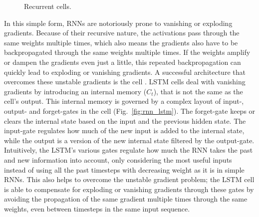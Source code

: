 			\begin{figure}[ht]
				\centering
				\caption[Recurrent cells]{Recurrent cells.}
				\label{fig:rnn}
			\end{figure}
			
			In this simple form, \acp{RNN} are notoriously prone to vanishing or exploding gradients.
			Because of their recursive nature, the activations pass through the same weights multiple times, which also means the gradients also have to be backpropagated through the same weights multiple times.
			If the weights amplify or dampen the gradients even just a little, this repeated backpropagation can quickly lead to exploding or vanishing gradients.		
			A successful architecture that overcomes these unstable gradients is the  cell \cite{lstm}.
			\ac{LSTM} cells deal with vanishing gradients by introducing an internal memory ($C_t$), that is not the same as the cell’s output.
			This internal memory is governed by a complex layout of input-, output- and forget-gates in the cell (Fig.~\ref{fig:rnn_lstm}).
			The forget-gate keeps or clears the internal state based on the input and the previous hidden state. 
			The input-gate regulates how much of the new input is added to the internal state, while the output is a version of the new internal state filtered by the output-gate.
			Intuitively, the \ac{LSTM}’s various gates regulate how much the \ac{RNN} takes the past and new information into account, only considering the most useful inputs instead of using all the past timesteps with decreasing weight as it is in simple \acp{RNN}.
			This also helps to overcome the unstable gradient problem; the \ac{LSTM} cell is able to compensate for exploding or vanishing gradients through these gates by avoiding the propagation of the same gradient multiple times through the same weights, even between timesteps in the same input sequence.
			
